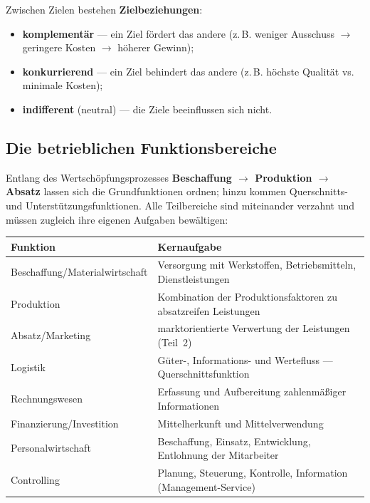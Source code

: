 \documentclass[11pt, a4paper]{article}
\begin{document}
Zwischen Zielen bestehen \textbf{Zielbeziehungen}:

\begin{itemize}
  \item \textbf{komplementär} --- ein Ziel fördert das andere (z.\,B. weniger Ausschuss
    $\rightarrow$ geringere Kosten $\rightarrow$ höherer Gewinn);
  \item \textbf{konkurrierend} --- ein Ziel behindert das andere (z.\,B. höchste Qualität
    vs. minimale Kosten);
  \item \textbf{indifferent} (neutral) --- die Ziele beeinflussen sich nicht.
\end{itemize}

\subsection{Die betrieblichen Funktionsbereiche}

Entlang des Wertschöpfungsprozesses \textbf{Beschaffung $\rightarrow$ Produktion
$\rightarrow$ Absatz} lassen sich die Grundfunktionen ordnen; hinzu kommen
Querschnitts- und Unterstützungsfunktionen. Alle Teilbereiche sind miteinander verzahnt
und müssen zugleich ihre eigenen Aufgaben bewältigen:

\begin{center}
\begin{tabular}{p{4.6cm} p{9.6cm}}
\textbf{Funktion} & \textbf{Kernaufgabe}\\
\hline
Beschaffung/Materialwirtschaft & Versorgung mit Werkstoffen, Betriebsmitteln, Dienstleistungen\\
Produktion & Kombination der Produktionsfaktoren zu absatzreifen Leistungen\\
Absatz/Marketing & marktorientierte Verwertung der Leistungen (Teil~2)\\
Logistik & Güter-, Informations- und Wertefluss --- Querschnittsfunktion\\
Rechnungswesen & Erfassung und Aufbereitung zahlenmäßiger Informationen\\
Finanzierung/Investition & Mittelherkunft und Mittelverwendung\\
Personalwirtschaft & Beschaffung, Einsatz, Entwicklung, Entlohnung der Mitarbeiter\\
Controlling & Planung, Steuerung, Kontrolle, Information (Management-Service)\\
\end{tabular}
\end{center}
\end{document}
